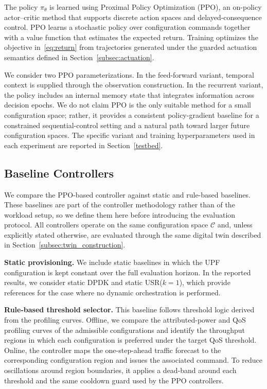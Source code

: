 \documentclass[a4paper,fleqn]{cas-sc}
\begin{document}
The policy $\pi_\theta$ is learned using Proximal Policy Optimization (PPO), an on-policy actor--critic method that supports discrete action spaces and delayed-consequence control. PPO learns a stochastic policy over configuration commands together with a value function that estimates the expected return. Training optimizes the objective in~\eqref{eq:return} from trajectories generated under the guarded actuation semantics defined in Section~\ref{subsec:actuation}.

We consider two PPO parameterizations. In the feed-forward variant, temporal context is supplied through the observation construction. In the recurrent variant, the policy includes an internal memory state that integrates information across decision epochs. We do not claim PPO is the only suitable method for a small configuration space; rather, it provides a consistent policy-gradient baseline for a constrained sequential-control setting and a natural path toward larger future configuration spaces. The specific variant and training hyperparameters used in each experiment are reported in Section~\ref{testbed}.



\subsection{Baseline Controllers}
\label{subsec:baselines}

We compare the PPO-based controller against static and rule-based baselines. These baselines are part of the controller methodology rather than of the workload setup, so we define them here before introducing the evaluation protocol. All controllers operate on the same configuration space $\mathcal{C}$ and, unless explicitly stated otherwise, are evaluated through the same digital twin described in Section~\ref{subsec:twin_construction}.

\textbf{Static provisioning.} We include static baselines in which the UPF configuration is kept constant over the full evaluation horizon. In the reported results, we consider static DPDK and static USR($k=1$), which provide references for the case where no dynamic orchestration is performed.

\textbf{Rule-based threshold selector.} This baseline follows threshold logic derived from the profiling curves. Offline, we compare the attributed-power and QoS profiling curves of the admissible configurations and identify the throughput regions in which each configuration is preferred under the target QoS threshold. Online, the controller maps the one-step-ahead traffic forecast to the corresponding configuration region and issues the associated command. To reduce oscillations around region boundaries, it applies a dead-band around each threshold and the same cooldown guard used by the PPO controllers.
\end{document}
